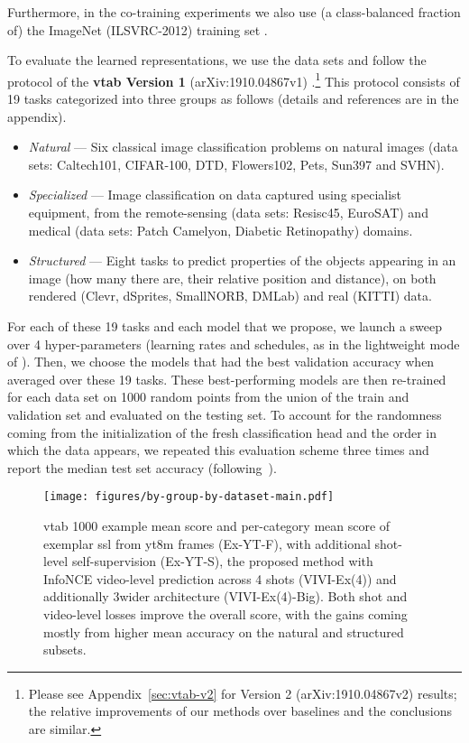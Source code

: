 \documentclass[10pt,twocolumn,letterpaper]{article}
\renewcommand{\paragraph}[1]{\noindent{\bf #1}\quad}
\begin{document}
{Furthermore, in the co-training experiments we also use (a class-balanced fraction of) the ImageNet (ILSVRC-2012) training set \cite{deng2009imagenet}. 

\paragraph{Downstream evaluation}
To evaluate the learned representations, we use the data sets and follow the protocol of the {\bf \gls{vtab} Version 1} (arXiv:1910.04867v1) \cite{zhai2019visual}.\footnote{Please see Appendix~\ref{sec:vtab-v2} for Version 2 (arXiv:1910.04867v2) results; the relative improvements of our methods over baselines and the conclusions are similar.}
This protocol consists of 19 tasks categorized into three groups as follows (details and references are in the appendix).
\begin{itemize}[itemsep=2pt,parsep=2pt]
    \item \emph{Natural} --- Six classical image classification problems on natural images (data sets: Caltech101, CIFAR-100, DTD, Flowers102, Pets, Sun397 and SVHN).
    \item \emph{Specialized} --- Image classification on data captured using specialist equipment, from the remote-sensing (data sets: Resisc45, EuroSAT) and medical (data sets: Patch Camelyon, Diabetic Retinopathy) domains.
    \item \emph{Structured} --- Eight tasks to predict properties of the objects appearing in an image (how many there are, their relative position and distance), on both rendered (Clevr, dSprites, SmallNORB, DMLab) and real (KITTI) data.
\end{itemize}


For each of these 19 tasks and each model that we propose, we launch a sweep over 4 hyper-parameters (learning rates and schedules, as in the lightweight mode of \cite{zhai2019visual}).
Then, we choose the models that had the best validation accuracy when averaged over these 19 tasks.
These best-performing models are then re-trained for each data set on 1000 random points from the union of the train and validation set and evaluated on the testing set.
To account for the randomness coming from the initialization of the fresh classification head and the order in which the data appears, we repeated this evaluation scheme three times and report the median test set accuracy (following~\cite{zhai2019visual}).

\begin{figure*}[t!]
\centering
\texttt{[image: figures/by-group-by-dataset-main.pdf]}
\vspace{-0.2cm}
\caption{\gls{vtab} 1000 example mean score and per-category mean score of exemplar \gls{ssl} from \gls{yt8m} frames (Ex-YT-F), with additional shot-level self-supervision (Ex-YT-S), the proposed method with InfoNCE video-level prediction across 4 shots (VIVI-Ex(4)) and additionally 3wider architecture (VIVI-Ex(4)-Big). Both shot and video-level losses improve the overall score, with the gains coming mostly from higher mean accuracy on the natural and structured subsets.}
\vspace{-0.2cm}
\label{fig:pure-ssl}
\end{figure*}

}
\end{document}
